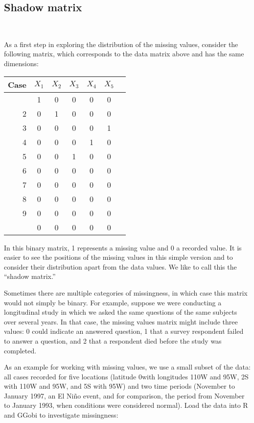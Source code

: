 \subsection{Shadow matrix}~\label{miss-shadow}


As a first step in exploring the distribution of the missing values,
consider the following matrix, which corresponds to the data matrix
above and has the same dimensions:

\begin{center}
\begin{tabular}{r@{\hspace{.5em}}|@{\hspace{.3em}}cccccc}
Case \T \B & $X_1$ & $X_2$ & $X_3$ & $X_4$ & $X_5$ \\\hline
\T1 & 1 & 0 & 0 & 0 & 0 \\
2 & 0 & 1 & 0 & 0 & 0 \\
3 & 0 & 0 & 0 & 0 & 1 \\
4 & 0 & 0 & 0 & 1 & 0 \\
5 & 0 & 0 & 1 & 0 & 0 \\
6 & 0 & 0 & 0 & 0 & 0 \\
7 & 0 & 0 & 0 & 0 & 0 \\
8 & 0 & 0 & 0 & 0 & 0 \\
9 & 0 & 0 & 0 & 0 & 0 \\
\B10 & 0 & 0 & 0 & 0 & 0 \\
\end{tabular}
\end{center}

In this binary matrix, 1 represents a missing value and 0 a recorded
value.  It is easier to see the positions of the missing values in
this simple version and to consider their distribution apart from the
data values.  We like to call this the ``shadow matrix.''

Sometimes there are multiple categories of missingness, in which case
this matrix would not simply be binary.  For example, suppose we were
conducting a longitudinal study in which we asked the same questions
of the same subjects over several years.  In that case, the missing
values matrix might include three values: 0 could indicate an answered
question, 1 that a survey respondent failed to answer a question, and
2 that a respondent died before the study was completed.


As an example for working with missing values, we use a small subset
of the  data: all cases recorded for five locations
(latitude 0\degree with longitudes 110{\degree}W and 95{\degree}W,
2{\degree}S with 110{\degree}W and 95{\degree}W, and 5{\degree}S with
95{\degree}W) and two time periods (November to January 1997, an El
Ni\~no event, and for comparison, the period from November to January
1993, when conditions were considered normal).  Load the data into R
and GGobi to investigate missingness:

